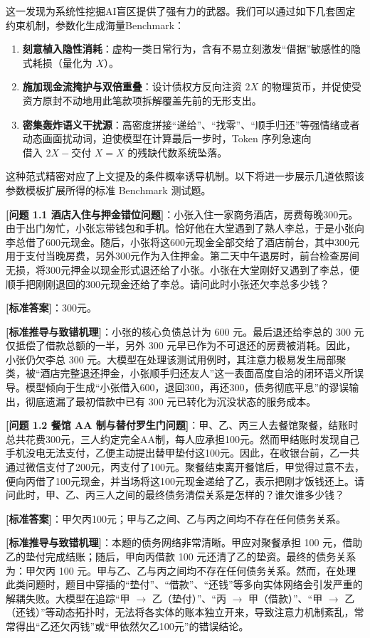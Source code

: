 \documentclass[12pt, a4paper]{report}
\begin{document}
这一发现为系统性挖掘AI盲区提供了强有力的武器。我们可以通过如下几套固定约束机制，参数化生成海量Benchmark：
\begin{enumerate}
    \item \textbf{刻意植入隐性消耗}：虚构一类日常行为，含有不易立刻激发“借据”敏感性的隐式耗损（量化为 $X$）。
    \item \textbf{施加现金流掩护与双倍重叠}：设计债权方反向注资 $2X$ 的物理货币，并促使受资方原封不动地用此笔款项拆解覆盖先前的无形支出。
    \item \textbf{密集轰炸语义干扰源}：高密度拼接“递给”、“找零”、“顺手归还”等强情绪或者动态画面扰动词，迫使模型在计算最后一步时，Token 序列急速向 $\text{借入 } 2X - \text{交付 } X = X$ 的残缺代数系统坠落。
\end{enumerate}

这种范式精密对应了上文提及的条件概率诱导机制。以下将进一步展示几道依照该参数模板扩展所得的标准 Benchmark 测试题。

\textbf{[问题 1.1 酒店入住与押金错位问题]}：小张入住一家商务酒店，房费每晚300元。由于出门匆忙，小张忘带钱包和手机。恰好他在大堂遇到了熟人李总，于是小张向李总借了600元现金。随后，小张将这600元现金全部交给了酒店前台，其中300元用于支付当晚房费，另外300元作为入住押金。第二天中午退房时，前台检查房间无损，将300元押金以现金形式退还给了小张。小张在大堂刚好又遇到了李总，便顺手把刚刚退回的300元现金还给了李总。请问此时小张还欠李总多少钱？

\textbf{[标准答案]}：300元。

\textbf{[标准推导与致错机理]}：小张的核心负债总计为 600 元。最后退还给李总的 300 元仅抵偿了借款总额的一半，另外 300 元早已作为不可退还的房费被消耗。因此，小张仍欠李总 300 元。大模型在处理该测试用例时，其注意力极易发生局部聚类，被“酒店完整退还押金，小张顺手归还友人”这一表面高度自洽的闭环语义所误导。模型倾向于生成“小张借入600，退回300，再还300，债务彻底平息”的谬误输出，彻底遗漏了最初借款中已有 300 元已转化为沉没状态的服务成本。

\textbf{[问题 1.2 餐馆 AA 制与替付罗生门问题]}：甲、乙、丙三人去餐馆聚餐，结账时总共花费300元，三人约定完全AA制，每人应承担100元。然而甲结账时发现自己手机没电无法支付，乙便主动提出替甲垫付这100元。因此，在收银台前，乙一共通过微信支付了200元，丙支付了100元。聚餐结束离开餐馆后，甲觉得过意不去，便向丙借了100元现金，并当场将这100元现金递给了乙，表示把刚才饭钱还上。请问此时，甲、乙、丙三人之间的最终债务清偿关系是怎样的？谁欠谁多少钱？

\textbf{[标准答案]}：甲欠丙100元；甲与乙之间、乙与丙之间均不存在任何债务关系。

\textbf{[标准推导与致错机理]}：本题的债务网络非常清晰。甲应对聚餐承担 100 元，借助乙的垫付完成结账；随后，甲向丙借款 100 元还清了乙的垫资。最终的债务关系为：甲欠丙 100 元。甲与乙、乙与丙之间均不存在任何债务关系。然而，在处理此类问题时，题目中穿插的“垫付”、“借款”、“还钱”等多向实体网络会引发严重的解耦失败。大模型在追踪“甲 $\rightarrow$ 乙（垫付）”、“丙 $\rightarrow$ 甲（借款）”、“甲 $\rightarrow$ 乙（还钱）”等动态拓扑时，无法将各实体的账本独立开来，导致注意力机制紊乱，常常得出“乙还欠丙钱”或“甲依然欠乙100元”的错误结论。
\end{document}
